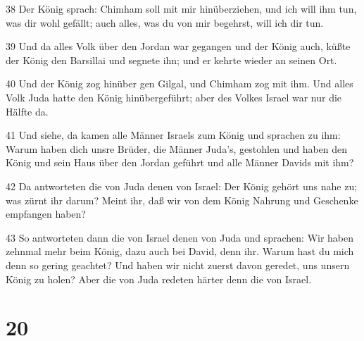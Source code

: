 \par 38 Der König sprach: Chimham soll mit mir hinüberziehen, und ich will ihm tun, was dir wohl gefällt; auch alles, was du von mir begehrst, will ich dir tun.
\par 39 Und da alles Volk über den Jordan war gegangen und der König auch, küßte der König den Barsillai und segnete ihn; und er kehrte wieder an seinen Ort.
\par 40 Und der König zog hinüber gen Gilgal, und Chimham zog mit ihm. Und alles Volk Juda hatte den König hinübergeführt; aber des Volkes Israel war nur die Hälfte da.
\par 41 Und siehe, da kamen alle Männer Israels zum König und sprachen zu ihm: Warum haben dich unsre Brüder, die Männer Juda's, gestohlen und haben den König und sein Haus über den Jordan geführt und alle Männer Davids mit ihm?
\par 42 Da antworteten die von Juda denen von Israel: Der König gehört uns nahe zu; was zürnt ihr darum? Meint ihr, daß wir von dem König Nahrung und Geschenke empfangen haben?
\par 43 So antworteten dann die von Israel denen von Juda und sprachen: Wir haben zehnmal mehr beim König, dazu auch bei David, denn ihr. Warum hast du mich denn so gering geachtet? Und haben wir nicht zuerst davon geredet, uns unsern König zu holen? Aber die von Juda redeten härter denn die von Israel.

\chapter{20}

